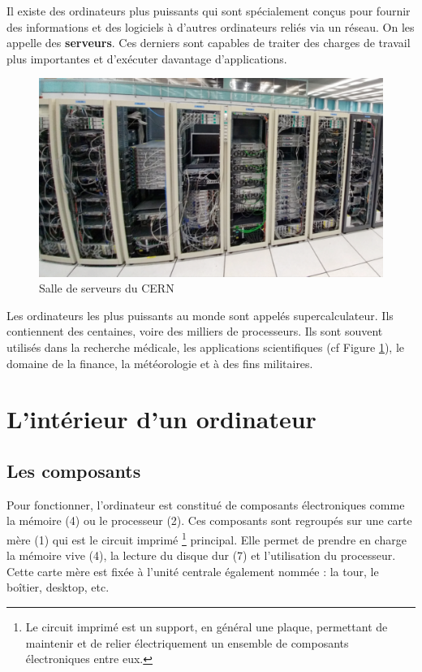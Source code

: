 \documentclass[11pt, a4paper]{book}
\begin{document}
	
	
Il existe des ordinateurs plus puissants qui sont spécialement conçus pour fournir des informations et des logiciels à d'autres ordinateurs reliés via un réseau. On les appelle des {\bf serveurs}. Ces derniers sont capables de traiter des charges de travail plus importantes et d'exécuter davantage d'applications.


\begin{figure}[h]
	\centering
	\includegraphics[scale=.4]{images/serveur}
	\caption{Salle de serveurs du CERN}
	\label{serveur}
\end{figure}


Les ordinateurs les plus puissants au monde sont appelés supercalculateur. Ils contiennent des centaines, voire des milliers de processeurs. Ils sont souvent utilisés dans la recherche médicale, les applications scientifiques (cf Figure \ref{serveur}), le domaine de la finance, la météorologie et à des fins militaires.


\section{L'intérieur d'un ordinateur}

\subsection{Les composants}

Pour fonctionner, l’ordinateur est constitué de composants électroniques comme la mémoire (4) ou le processeur (2). Ces composants sont regroupés sur une carte mère (1) qui est le circuit imprimé \footnote{Le circuit imprimé est un support, en général une plaque, permettant de maintenir et de relier électriquement un ensemble de composants électroniques entre eux.} principal. Elle permet de prendre en charge la mémoire vive (4), la lecture du disque dur (7) et l'utilisation du processeur. Cette carte mère est fixée à l'unité centrale également nommée : la tour, le boîtier, desktop, etc.
\end{document}
